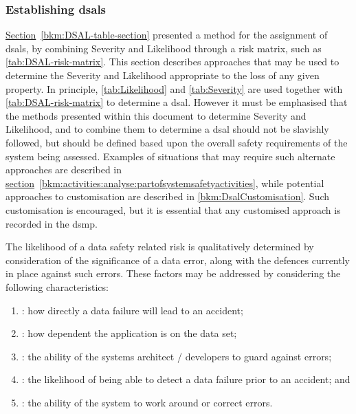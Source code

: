 \subsubsection{Establishing \glspl{dsal}}
\label{bkm:Establishing-DSALS}
\hyperref[bkm:DSAL-table-section]{Section}~\ref{bkm:DSAL-table-section} %
presented a method for the assignment of \gls{dsal}s, by combining Severity and Likelihood through a risk matrix, such as \autoref{tab:DSAL-risk-matrix}. This section describes approaches that may be used to determine the Severity and Likelihood appropriate to the loss of any given property. In principle, \autoref {tab:Likelihood} and \autoref{tab:Severity} are used together with \autoref{tab:DSAL-risk-matrix} to determine a \gls{dsal}. However it must be emphasised that the methods presented within this document to determine Severity and Likelihood, and to combine them to determine a \gls{dsal} should not be slavishly followed, but should be defined based upon the overall safety requirements of the system being assessed. Examples of situations that may require such alternate approaches are described in
\hyperref[bkm:activities:analyse:partofsystemsafetyactivities]{section}~\ref{bkm:activities:analyse:partofsystemsafetyactivities}, %
while potential approaches to customisation are described in \autoref{bkm:DsalCustomisation}.
Such customisation is encouraged, but it is essential that any customised approach is recorded in the \gls{dsmp}.

The likelihood of a data safety related risk is qualitatively determined by
consideration of the significance of a data error, along with the defences currently in place against such errors. These factors may be addressed by
considering the following characteristics:

\begin{enumerate}
  \item {}: how directly a data failure will lead to an accident;
  \item {}: how dependent the application is on the data set;
  \item {}: the ability of the systems architect / developers to guard against errors;
  \item {}: the likelihood of being able to detect a data failure prior to an accident; and
  \item {}: the ability of the system to work around or correct errors.
\end{enumerate}

